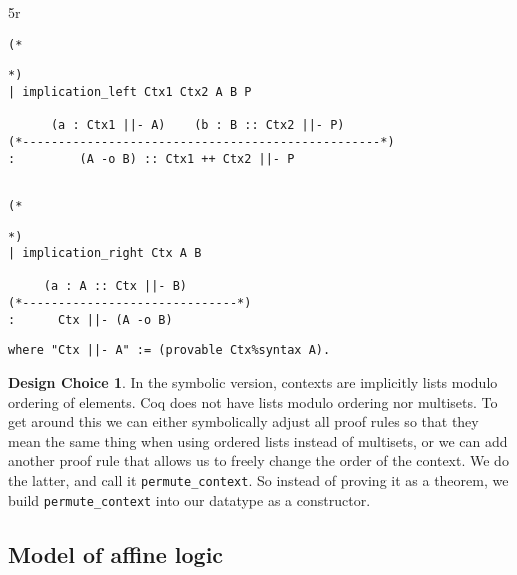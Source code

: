 5r\documentclass{article}
\theoremstyle{definition}
\newtheorem*{designchoice}{Design Choice}
\begin{document}
\noindent\begin{minipage}{\textwidth}
\begin{verbatim}
(*
\end{verbatim}
\begin{center}\usebox{\lolliL}\end{center}
\begin{verbatim}
*)
| implication_left Ctx1 Ctx2 A B P

      (a : Ctx1 ||- A)    (b : B :: Ctx2 ||- P)
(*--------------------------------------------------*)
:         (A -o B) :: Ctx1 ++ Ctx2 ||- P


\end{verbatim}
\end{minipage}

\noindent\begin{minipage}{\textwidth}
\begin{verbatim}
(*
\end{verbatim}
\begin{center}\usebox{\lolliR}\end{center}
\begin{verbatim}
*)
| implication_right Ctx A B

     (a : A :: Ctx ||- B)
(*------------------------------*)
:      Ctx ||- (A -o B)
\end{verbatim}
\end{minipage}

\begin{verbatim}
where "Ctx ||- A" := (provable Ctx%syntax A).
\end{verbatim}



\begin{designchoice}
In the symbolic version, contexts are implicitly lists modulo ordering of elements. Coq does not have lists modulo ordering nor multisets. To get around this we can either symbolically adjust all proof rules so that they mean the same thing when using ordered lists instead of multisets, or we can add another proof rule that allows us to freely change the order of the context. We do the latter, and call it \verb|permute_context|. So instead of proving it as a theorem, we build \verb|permute_context| into our datatype as a constructor. 
\end{designchoice}

\subsection{Model of affine logic}
\end{document}
